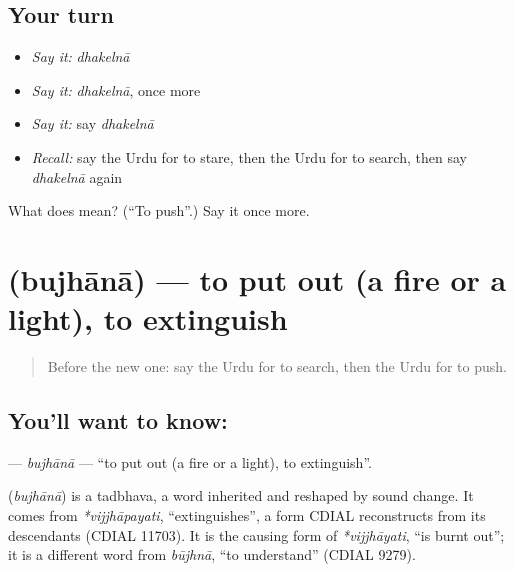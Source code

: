 \subsection*{Your turn}
\begin{itemize}
\raggedright
  \item \emph{Say it:} \emph{dhakelnā}
  \item \emph{Say it:} \emph{dhakelnā}, once more
  \item \emph{Say it:} say \emph{dhakelnā}
  \item \emph{Recall:} say the Urdu for to stare, then the Urdu for to search, then say \emph{dhakelnā} again
\end{itemize}

\begin{tcolorbox}[breakable,colback=teal!4,colframe=teal!35!black,title={Before you move on}]
What does  mean? (\textquotedblleft{}To push\textquotedblright{}.) Say it once more.
\end{tcolorbox}
\section[\texorpdfstring{\ur{بجھانا} (bujhānā)}{بجھانا (bujhānā)}]{ (bujhānā) — to put out (a fire or a light), to extinguish}

\label{lesson:UR-C240-bujhana}



\begin{quote}
Before the new one: say the Urdu for to search, then the Urdu for to push.
\end{quote}

\subsection*{You'll want to know: }
\textbf{} — \emph{bujhānā} — \textquotedblleft{}to put out (a fire or a light), to extinguish\textquotedblright{}.

\begin{cousinweb}
\textbf{} (\emph{bujhānā}) is a tadbhava, a word inherited and reshaped by sound change. It comes from \emph{*vijjhāpayati}, \textquotedblleft{}extinguishes\textquotedblright{}, a form CDIAL reconstructs from its descendants (CDIAL 11703). It is the causing form of \emph{*vijjhāyati}, \textquotedblleft{}is burnt out\textquotedblright{}; it is a different word from \emph{būjhnā}, \textquotedblleft{}to understand\textquotedblright{} (CDIAL 9279).
\end{cousinweb}

